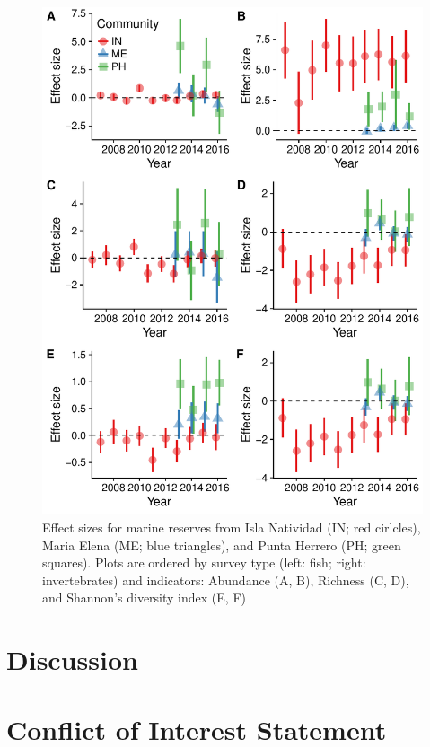 \documentclass{frontiersSCNS}
\begin{document}
\begin{figure}
\centering
\includegraphics{Villasenor-Derbez_files/figure-latex/unnamed-chunk-3-1.pdf}
\caption{\label{fig:unnamed-chunk-3}\label{fig:indicators}Effect sizes for
marine reserves from Isla Natividad (IN; red cirlcles), Maria Elena (ME;
blue triangles), and Punta Herrero (PH; green squares). Plots are
ordered by survey type (left: fish; right: invertebrates) and
indicators: Abundance (A, B), Richness (C, D), and Shannon's diversity
index (E, F)}
\end{figure}

\section{Discussion}\label{discussion}

\section*{Conflict of Interest Statement}
\end{document}
